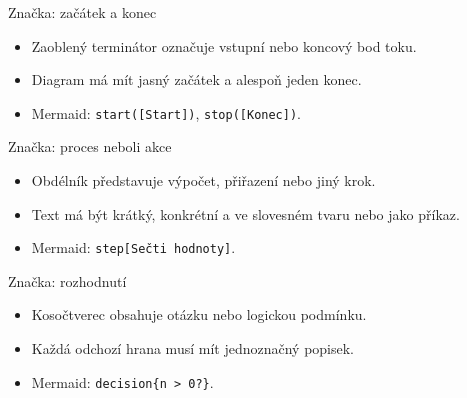 \documentclass[aspectratio=169]{beamer}
\begin{document}
\begin{frame}{Značka: začátek a konec}
  \centering
  \vspace{8mm}
  \begin{itemize}
    \item Zaoblený terminátor označuje vstupní nebo koncový bod toku.
    \item Diagram má mít jasný začátek a alespoň jeden konec.
    \item Mermaid: \texttt{start([Start])}, \texttt{stop([Konec])}.
  \end{itemize}
\end{frame}

\begin{frame}{Značka: proces neboli akce}
  \centering
  \vspace{8mm}
  \begin{itemize}
    \item Obdélník představuje výpočet, přiřazení nebo jiný krok.
    \item Text má být krátký, konkrétní a ve slovesném tvaru nebo jako příkaz.
    \item Mermaid: \texttt{step[Sečti hodnoty]}.
  \end{itemize}
\end{frame}

\begin{frame}{Značka: rozhodnutí}
  \centering
  \vspace{1mm}
  \begin{itemize}
    \item Kosočtverec obsahuje otázku nebo logickou podmínku.
    \item Každá odchozí hrana musí mít jednoznačný popisek.
    \item Mermaid: \texttt{decision\{n > 0?\}}.
  \end{itemize}
\end{frame}
\end{document}
